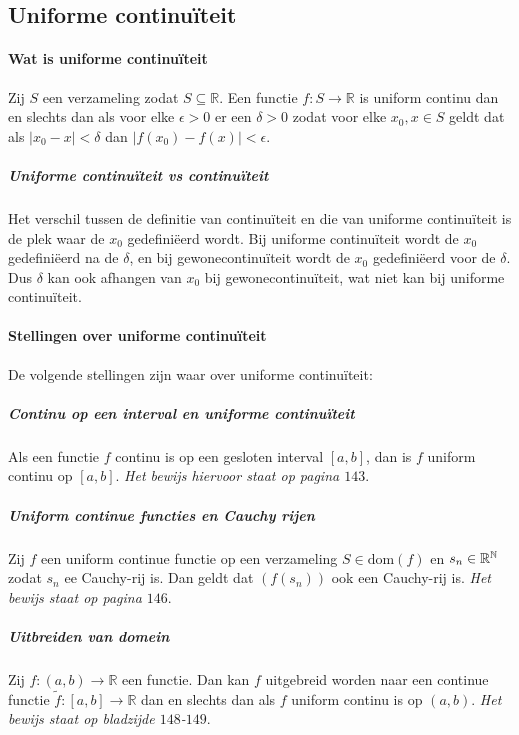 \subsection{Uniforme continuïteit}

\paragraph{Wat is uniforme continuïteit} Zij $S$ een verzameling zodat $S\subseteq\mathbb{R}$. Een functie $f:S\to\mathbb{R}$ is uniform continu dan en slechts dan als voor elke $\epsilon>0$ er een $\delta>0$ zodat voor elke $x_{0},x \in S$ geldt dat als $|x_{0}-x|<\delta$ dan $|f(x_{0})-f(x)|<\epsilon$.

\subparagraph{Uniforme continuïteit vs continuïteit} Het verschil tussen de definitie van continuïteit en die van uniforme continuïteit is de plek waar de $x_{0}$ gedefiniëerd wordt. Bij uniforme continuïteit wordt de $x_{0}$ gedefiniëerd na de $\delta$, en bij \bq gewone\eq continuïteit wordt de $x_{0}$ gedefiniëerd voor de $\delta$. Dus $\delta$ kan ook afhangen van $x_{0}$ bij \bq gewone\eq continuïteit, wat niet kan bij uniforme continuïteit.

\paragraph{Stellingen over uniforme continuïteit} De volgende stellingen zijn waar over uniforme continuïteit:

\subparagraph{Continu op een interval en uniforme continuïteit} Als een functie $f$ continu is op een gesloten interval $[a,b]$, dan is $f$ uniform continu op $[a,b]$. \textit{Het bewijs hiervoor staat op pagina $143$}.

\subparagraph{Uniform continue functies en Cauchy rijen} Zij $f$ een uniform continue functie op een verzameling $S\in\text{dom}(f)$ en $s_{n}\in\mathbb{R}^{\mathbb{N}}$ zodat $s_{n}$ ee Cauchy-rij is. Dan geldt dat $(f(s_{n}))$ ook een Cauchy-rij is. \textit{Het bewijs staat op pagina $146$}.

\subparagraph{Uitbreiden van domein} Zij $f:(a,b)\to\mathbb{R}$ een functie. Dan kan $f$ uitgebreid worden naar een continue functie $\widetilde{f}:[a,b]\to\mathbb{R}$ dan en slechts dan als $f$ uniform continu is op $(a,b)$. \textit{Het bewijs staat op bladzijde $148$-$149$}.